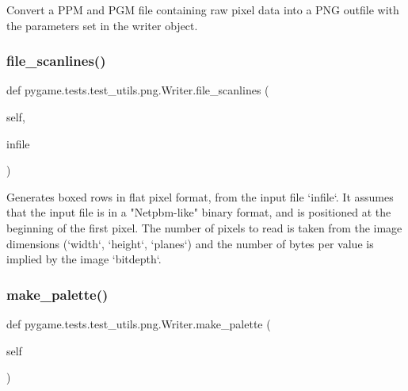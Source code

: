 \begin{DoxyVerb}Convert a PPM and PGM file containing raw pixel data into a
PNG outfile with the parameters set in the writer object.
\end{DoxyVerb}
 \mbox{\label{classpygame_1_1tests_1_1test__utils_1_1png_1_1_writer_a56892ba1b39c4d92709a64f3dda53e3d}} 
\subsubsection{\texorpdfstring{file\+\_\+scanlines()}{file\_scanlines()}}
{\footnotesize\ttfamily def pygame.\+tests.\+test\+\_\+utils.\+png.\+Writer.\+file\+\_\+scanlines (\begin{DoxyParamCaption}\item[{}]{self,  }\item[{}]{infile }\end{DoxyParamCaption})}

\begin{DoxyVerb}Generates boxed rows in flat pixel format, from the input file
`infile`.  It assumes that the input file is in a "Netpbm-like"
binary format, and is positioned at the beginning of the first
pixel.  The number of pixels to read is taken from the image
dimensions (`width`, `height`, `planes`) and the number of bytes
per value is implied by the image `bitdepth`.
\end{DoxyVerb}
 \mbox{\label{classpygame_1_1tests_1_1test__utils_1_1png_1_1_writer_ade595d749a6b9d15af372b94169aa700}} 
\subsubsection{\texorpdfstring{make\+\_\+palette()}{make\_palette()}}
{\footnotesize\ttfamily def pygame.\+tests.\+test\+\_\+utils.\+png.\+Writer.\+make\+\_\+palette (\begin{DoxyParamCaption}\item[{}]{self }\end{DoxyParamCaption})}

